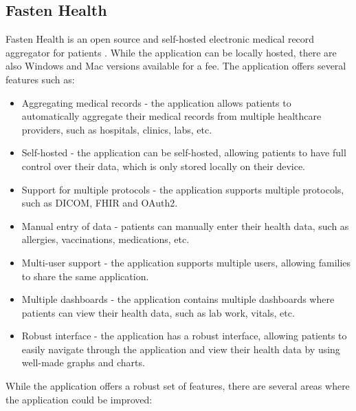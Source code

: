 \subsection{Fasten Health}

Fasten Health is an open source and self-hosted electronic medical record aggregator for patients \parencite{fasten}. While the application can be locally hosted, there are also Windows and Mac versions available for a fee. The application offers several features such as:

\begin{itemize}
    \item Aggregating medical records - the application allows patients to automatically aggregate their medical records from multiple healthcare providers, such as hospitals, clinics, labs, etc.
    \item Self-hosted - the application can be self-hosted, allowing patients to have full control over their data, which is only stored locally on their device.
    \item Support for multiple protocols - the application supports multiple protocols, such as DICOM, FHIR and OAuth2.
    \item Manual entry of data - patients can manually enter their health data, such as allergies, vaccinations, medications, etc.
    \item Multi-user support - the application supports multiple users, allowing families to share the same application.
    \item Multiple dashboards - the application contains multiple dashboards where patients can view their health data, such as lab work, vitals, etc.
    \item Robust interface - the application has a robust interface, allowing patients to easily navigate through the application and view their health data by using well-made graphs and charts.
\end{itemize}

While the application offers a robust set of features, there are several areas where the application could be improved:

